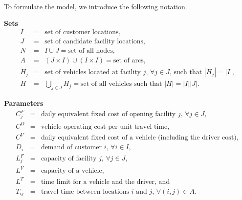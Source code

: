 To formulate the model, we introduce the following notation.

{\bf Sets}
\begin{eqnarray*}
I & = & \mbox{set of customer locations,} \\
J & = & \mbox{set of candidate facility locations,} \\
N & = & I \cup J = \mbox{set of all nodes,} \\
A & = & (J \times I) \cup (I \times I) = \mbox{set of arcs,}\\ 
H_j & = & \mbox{set of vehicles located at facility $j$, 
$\forall j \in J$, such that $|H_j|=|I|$,} \\ 
H & = & \bigcup_{j \in J}H_j = \mbox{set of all vehicles such that $|H|=|I||J|$.} 
\end{eqnarray*}


{\bf Parameters}
\begin{eqnarray*}
C^F_j & = & \mbox{daily equivalent fixed cost of opening facility $j$, $\forall j \in J$,} \\
C^O & = & \mbox{vehicle operating cost per unit travel time,} \\
C^V & = & \mbox{daily equivalent fixed cost of a vehicle (including the driver cost),} \\
D_i & = & \mbox{demand of customer $i$, $\forall i \in I$,} \\
L^F_j & = & \mbox{capacity of facility $j$, $\forall j \in J$,} \\
L^V & = & \mbox{capacity of a vehicle,} \\
L^T & = & \mbox{time limit for a vehicle and the driver, and} \\
T_{ij} & = & \mbox{travel time between locations $i$ and $j$, $\forall (i,j) \in A$.} 
\end{eqnarray*}

